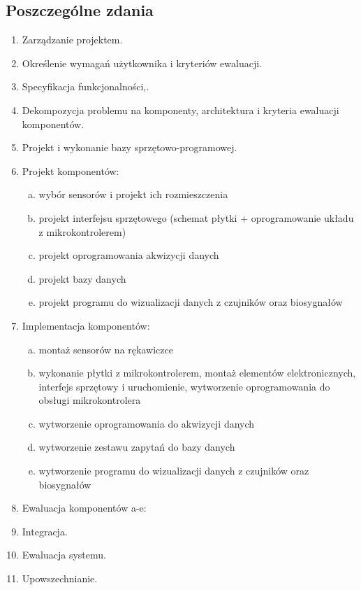 \documentclass{article}
\begin{document}
\subsection{Poszczególne zdania}
\begin{enumerate}
    \item Zarządzanie projektem.
    \item Określenie wymagań użytkownika i kryteriów ewaluacji.
    \item Specyfikacja funkcjonalności,.
    \item Dekompozycja problemu na komponenty, architektura i kryteria ewaluacji komponentów. %
    \item Projekt i wykonanie bazy sprzętowo-programowej.
    \item Projekt komponentów:
    \begin{enumerate}[a)]
        \item wybór sensorów i projekt ich rozmieszczenia
        \item projekt interfejsu sprzętowego (schemat płytki + oprogramowanie układu z mikrokontrolerem)
        \item projekt oprogramowania akwizycji danych
        \item projekt bazy danych
        \item projekt programu do wizualizacji danych z czujników oraz biosygnałów

    \end{enumerate}
        \item Implementacja komponentów:
    \begin{enumerate}[a)]
        \item montaż sensorów na rękawiczce
        \item wykonanie płytki z mikrokontrolerem, montaż elementów elektronicznych, interfejs sprzętowy i uruchomienie, wytworzenie oprogramowania do obsługi mikrokontrolera
        \item wytworzenie oprogramowania do akwizycji danych
        \item wytworzenie zestawu zapytań do bazy danych
        \item wytworzenie programu do wizualizacji danych z czujników oraz biosygnałów


    \end{enumerate}
            \item Ewaluacja komponentów a-e:
    \item Integracja.
    \item Ewaluacja systemu.
    \item Upowszechnianie.
\end{enumerate}
\end{document}
